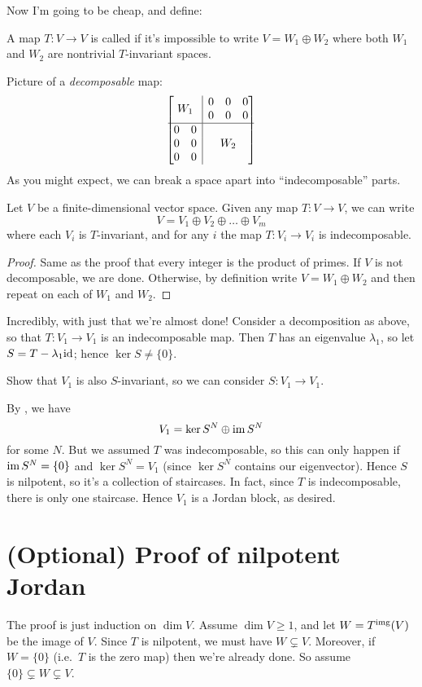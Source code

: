 Now I'm going to be cheap, and define:
\begin{definition}
	A map $T \colon V \to V$ is called 
	if it's impossible to write $V = W_1 \oplus W_2$
	where both $W_1$ and $W_2$ are nontrivial $T$-invariant spaces.
\end{definition}
Picture of a \emph{decomposable} map:
\[
	\begin{bmatrix}
		\multicolumn{2}{c|}{\multirow{2}{*}{$W_1$}} & 0 & 0 & 0  \\
		\multicolumn{2}{c|}{} & 0 & 0 & 0 \\ \hline
		0 & 0 & \multicolumn{3}{|c}{\multirow{3}{*}{$W_2$}} \\
		0 & 0 & \multicolumn{3}{|c}{} \\
		0 & 0 & \multicolumn{3}{|c}{}
	\end{bmatrix}
\]
As you might expect, we can break a space apart into ``indecomposable'' parts.
\begin{proposition}
	Let $V$ be a finite-dimensional vector space.
	Given any map $T \colon V \to V$, we can write
	\[ V = V_1 \oplus V_2 \oplus \dots \oplus V_m \]
	where each $V_i$ is $T$-invariant,
	and for any $i$ the map $T \colon V_i \to V_i$ is indecomposable.
\end{proposition}
\begin{proof}
	Same as the proof that every integer is the product of primes.
	If $V$ is not decomposable, we are done.
	Otherwise, by definition write $V = W_1 \oplus W_2$
	and then repeat on each of $W_1$ and $W_2$.
\end{proof}

Incredibly, with just that we're almost done!
Consider a decomposition as above,
so that $T \colon V_1 \to V_1$ is an indecomposable map.
Then $T$ has an eigenvalue $\lambda_1$, so let $S = T - \lambda_1 \mathrm{id}$; hence $\ker S \neq \{0\}$.
\begin{ques}
	Show that $V_1$ is also $S$-invariant, so we can consider $S \colon V_1 \to V_1$.
\end{ques}
By , we have
\[ V_1 = \ker S^N \oplus \operatorname{im} S^N \]
for some $N$.
But we assumed $T$ was indecomposable,
so this can only happen if $\operatorname{im} S^N = \{0\}$ and $\ker S^N = V_1$
(since $\ker S^N$ contains our eigenvector).
Hence $S$ is nilpotent, so it's a collection of staircases.
In fact, since $T$ is indecomposable, there is only one staircase.
Hence $V_1$ is a Jordan block, as desired.

\section{(Optional) Proof of nilpotent Jordan}
The proof is just induction on $\dim V$.
Assume $\dim V \ge 1$, and let $W = T^{\text{img}}(V)$ be the image of $V$.
Since $T$ is nilpotent, we must have $W \subsetneq V$.
Moreover, if $W = \{0\}$ (i.e.\ $T$ is the zero map) then we're already done.
So assume $\{0\} \subsetneq W \subsetneq V$.

